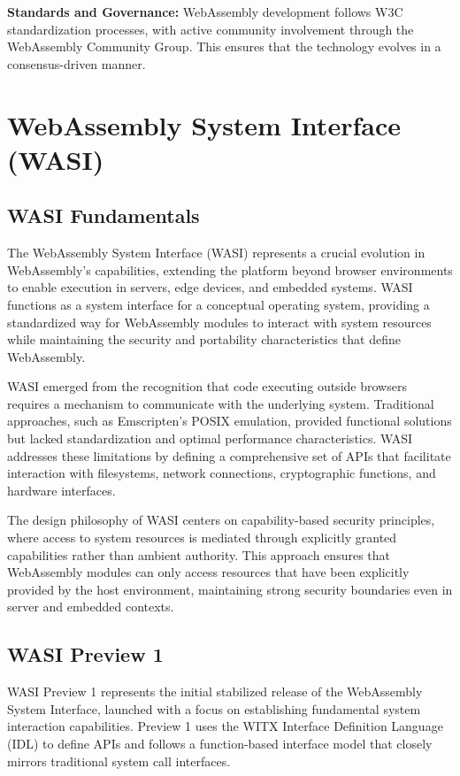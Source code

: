 \textbf{Standards and Governance:} WebAssembly development follows W3C standardization processes, with active community involvement through the WebAssembly Community Group. This ensures that the technology evolves in a consensus-driven manner.

\section{WebAssembly System Interface (WASI)}
\label{sec:wasi}

\subsection{WASI Fundamentals}
\label{subsec:wasi-fundamentals}

The WebAssembly System Interface (WASI) represents a crucial evolution in WebAssembly's capabilities, extending the platform beyond browser environments to enable execution in servers, edge devices, and embedded systems\cite{wasi_mozilla_blog}. WASI functions as a system interface for a conceptual operating system, providing a standardized way for WebAssembly modules to interact with system resources while maintaining the security and portability characteristics that define WebAssembly.

WASI emerged from the recognition that code executing outside browsers requires a mechanism to communicate with the underlying system. Traditional approaches, such as Emscripten's POSIX emulation, provided functional solutions but lacked standardization and optimal performance characteristics. WASI addresses these limitations by defining a comprehensive set of APIs that facilitate interaction with filesystems, network connections, cryptographic functions, and hardware interfaces.

The design philosophy of WASI centers on capability-based security principles, where access to system resources is mediated through explicitly granted capabilities rather than ambient authority. This approach ensures that WebAssembly modules can only access resources that have been explicitly provided by the host environment, maintaining strong security boundaries even in server and embedded contexts.

\subsection{WASI Preview 1}
\label{subsec:wasi-preview1}

WASI Preview 1 represents the initial stabilized release of the WebAssembly System Interface, launched with a focus on establishing fundamental system interaction capabilities. Preview 1 uses the WITX Interface Definition Language (IDL) to define APIs and follows a function-based interface model that closely mirrors traditional system call interfaces.

